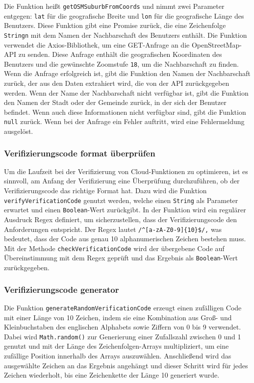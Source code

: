 Die Funktion heißt \texttt{getOSMSuburbFromCoords} und nimmt zwei Parameter entgegen: \texttt{lat} für die geografische Breite und \texttt{lon} für die geografische Länge des Benutzers. Diese Funktion gibt eine Promise zurück, die eine Zeichenfolge \texttt{Stringn} mit dem Namen der Nachbarschaft des Benutzers enthält. Die Funktion verwendet die Axios-Bibliothek, um eine GET-Anfrage an die OpenStreetMap-API zu senden. Diese Anfrage enthält die geografischen Koordinaten des Benutzers und die gewünschte Zoomstufe \texttt{18}, um die Nachbarschaft zu finden. Wenn die Anfrage erfolgreich ist, gibt die Funktion den Namen der Nachbarschaft zurück, der aus den Daten extrahiert wird, die von der API zurückgegeben werden. Wenn der Name der Nachbarschaft nicht verfügbar ist, gibt die Funktion den Namen der Stadt oder der Gemeinde zurück, in der sich der Benutzer befindet. Wenn auch diese Informationen nicht verfügbar sind, gibt die Funktion \texttt{null} zurück. Wenn bei der Anfrage ein Fehler auftritt, wird eine Fehlermeldung ausgelöst.


\subsubsection{Verifizierungscode format überprüfen}
Um die Laufzeit bei der Verifizierung von Cloud-Funktionen zu optimieren, ist es sinnvoll, am Anfang der Verifizierung eine Überprüfung durchzuführen, ob der Verifizierungscode das richtige Format hat. Dazu wird die Funktion \texttt{verifyVerificationCode} genutzt werden, welche einen \texttt{String} als Parameter erwartet und einen \texttt{Boolean}-Wert zurückgibt. In der Funktion wird ein regulärer Ausdruck Regex definiert, um sicherzustellen, dass der Verifizierungscode den Anforderungen entspricht. Der Regex lautet \texttt{/}\verb|^[a-zA-Z0-9]{10}$/|\texttt{,} was bedeutet, dass der Code aus genau 10 alphanumerischen Zeichen bestehen muss. Mit der Methode \texttt{checkVerificationCode} wird der übergebene Code auf Übereinstimmung mit dem Regex geprüft und das Ergebnis als \texttt{Boolean}-Wert zurückgegeben.

\subsubsection{Verifizierungscode generator}

Die Funktion \texttt{generateRandomVerificationCode} erzeugt einen zufälligen Code mit einer Länge von 10 Zeichen, indem sie eine Kombination aus Groß- und Kleinbuchstaben des englischen Alphabets sowie Ziffern von 0 bis 9 verwendet. Dabei wird \texttt{Math.random()} zur Generierung einer Zufallszahl zwischen 0 und 1 genutzt und mit der Länge des Zeichenfolgen-Arrays multipliziert, um eine zufällige Position innerhalb des Arrays auszuwählen. Anschließend wird das ausgewählte Zeichen an das Ergebnis angehängt und dieser Schritt wird für jedes Zeichen wiederholt, bis eine Zeichenkette der Länge 10 generiert wurde.

